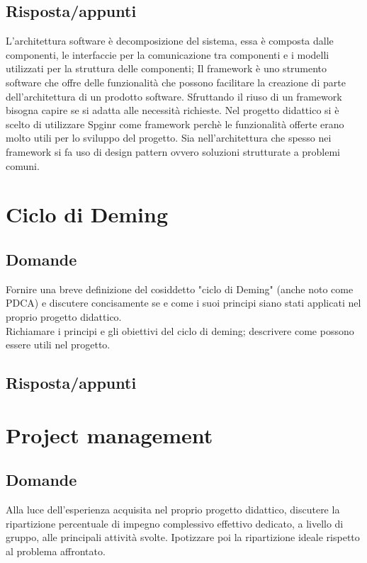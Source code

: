 \subsection*{Risposta/appunti}
L'architettura software è decomposizione del sistema, essa è composta dalle componenti, le interfaccie per la
comunicazione tra componenti e i modelli utilizzati per la struttura delle componenti;
Il framework è uno strumento software che offre delle funzionalità che possono facilitare la creazione di parte
dell'architettura di un prodotto software.
Sfruttando il riuso di un framework bisogna capire se si adatta alle necessità richieste. Nel progetto didattico si è scelto
di utilizzare Spginr come framework perchè le funzionalità offerte erano molto utili per lo sviluppo del progetto.
Sia nell'architettura che spesso nei framework si fa uso di design pattern ovvero soluzioni strutturate a problemi comuni.

\section{Ciclo di Deming}

\subsection*{Domande}
Fornire una breve definizione del cosiddetto "ciclo di Deming" (anche noto come PDCA) e discutere concisamente se e come i suoi principi siano stati applicati nel proprio progetto didattico.\\

Richiamare i principi e gli obiettivi del ciclo di deming; descrivere come possono essere utili nel progetto.

\subsection*{Risposta/appunti}


\section{Project management}

\subsection*{Domande}
Alla luce dell'esperienza acquisita nel proprio progetto didattico, discutere la ripartizione percentuale di impegno complessivo effettivo dedicato, a livello di gruppo, alle principali attività svolte. 
Ipotizzare poi la ripartizione ideale rispetto al problema affrontato.\\

